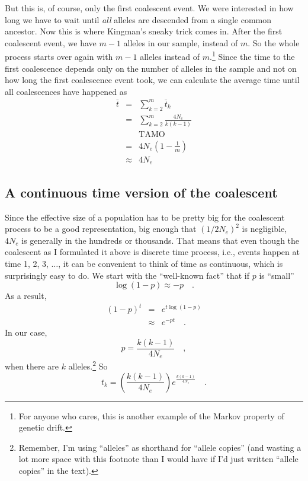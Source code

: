 \documentclass[12pt]{article}
\begin{document}
But this is, of course, only the first coalescent event. We were
interested in how long we have to wait until {\it all\/} alleles are
descended from a single common ancestor. Now this is where Kingman's
sneaky trick comes in. After the first coalescent event, we have $m-1$
alleles in our sample, instead of $m$. So the whole process starts
over again with $m-1$ alleles instead of $m$.\footnote{For anyone who
  cares, this is another example of the Markov property of genetic
  drift.} Since the time to the
first coalescence depends only on the number of alleles in the sample
and not on how long the first coalescence event took, we can calculate
the average time until all coalescences have happened
as
\begin{eqnarray*}
\bar t &=& \sum_{k=2}^m \bar t_k \\
       &=& \sum_{k=2}^m \frac{4N_e}{k(k-1)} \\
       && \mbox{TAMO} \\
       &=& 4N_e\left(1 - \frac{1}{m}\right) \\
       &\approx& 4N_e
\end{eqnarray*}

\subsection*{A continuous time version of the coalescent}

Since the effective size of a population has to be pretty big for the
coalescent process to be a good representation, big enough that
$(1/2N_e)^2$ is negligible, $4N_e$ is generally in the hundreds or
thousands. That means that even though the coalescent as I formulated
it above is discrete time process, i.e., events happen at time 1, 2,
3, $\dots$, it can be convenient to think of time as continuous, which
is surprisingly easy to do. We start with the ``well-known fact'' that
if $p$ is ``small''
\[
\log(1-p) \approx -p \quad .
\]
As a result,
\begin{eqnarray*}
(1 - p)^t &=& e^{t \log(1-p)} \\
          &\approx& e^{-pt} \quad .
\end{eqnarray*}
In our case,
\[
p = \frac{k(k-1)}{4N_e} \quad ,
\]
when there are $k$ alleles.\footnote{Remember, I'm using ``alleles''
  as shorthand for ``allele copies'' (and wasting a lot more space
  with this footnote than I would have if I'd just written ``allele
  copies'' in the text).} So
\[
t_k = \left(\frac{k(k-1)}{4N_e}\right)e^{\frac{k(k-1)}{4N_e}} \quad .
\]
\end{document}
